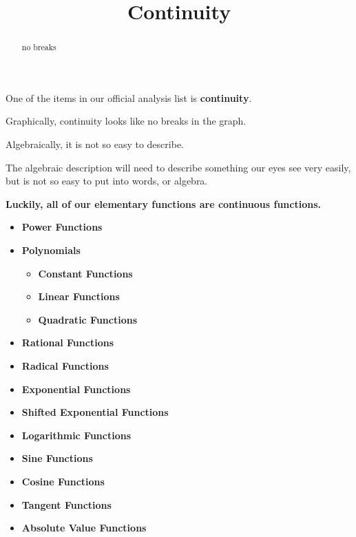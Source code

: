 \documentclass{ximera}
\title{Continuity}
\begin{document}
\begin{abstract}
no breaks
\end{abstract}
\maketitle





One of the items in our official analysis list is \textbf{continuity}. 

Graphically, continuity looks like no breaks in the graph. 

Algebraically, it is not so easy to describe. 


The algebraic description will need to describe something our eyes see very easily, but is not so easy to put into words, or algebra. 



\begin{center}
\textbf{\textcolor{red!70!black}{Luckily, all of our elementary functions are continuous functions.}}   
\end{center}





\begin{itemize}
	\item \textbf{\textcolor{blue!55!black}{Power Functions}} 
	\item \textbf{\textcolor{blue!55!black}{Polynomials}}
	\begin{itemize}
		\item \textbf{\textcolor{purple!85!blue}{Constant Functions}}
		\item \textbf{\textcolor{purple!85!blue}{Linear Functions}}
		\item \textbf{\textcolor{purple!85!blue}{Quadratic Functions}}
	\end{itemize}
	\item \textbf{\textcolor{blue!55!black}{Rational Functions}}
	\item \textbf{\textcolor{blue!55!black}{Radical Functions}}
	\item \textbf{\textcolor{blue!55!black}{Exponential Functions}}
	\item \textbf{\textcolor{blue!55!black}{Shifted Exponential Functions}}
	\item \textbf{\textcolor{blue!55!black}{Logarithmic Functions}}
	\item \textbf{\textcolor{blue!55!black}{Sine Functions}}
	\item \textbf{\textcolor{blue!55!black}{Cosine Functions}}
	\item \textbf{\textcolor{blue!55!black}{Tangent Functions}}
	\item \textbf{\textcolor{blue!55!black}{Absolute Value Functions}}
\end{itemize}
\end{document}
